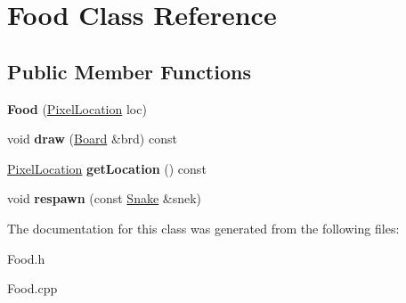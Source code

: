 \hypertarget{class_food}{}\section{Food Class Reference}
\label{class_food}
\subsection*{Public Member Functions}
\begin{DoxyCompactItemize}
\item 
\mbox{\label{class_food_abf88eb6961b943a2d481c08eca91cc2d}} 
{\bfseries Food} (\hyperlink{class_pixel_location}{Pixel\+Location} loc)
\item 
\mbox{\label{class_food_a2757ddcb688ca74d3e2e79d645e0ed0e}} 
void {\bfseries draw} (\hyperlink{class_board}{Board} \&brd) const
\item 
\mbox{\label{class_food_a7c3ffe081ee2b479696c0c89ed95455c}} 
\hyperlink{class_pixel_location}{Pixel\+Location} {\bfseries get\+Location} () const
\item 
\mbox{\label{class_food_afcd8485cf59e61adcc28cfc237bf3001}} 
void {\bfseries respawn} (const \hyperlink{class_snake}{Snake} \&snek)
\end{DoxyCompactItemize}


The documentation for this class was generated from the following files\+:\begin{DoxyCompactItemize}
\item 
Food.\+h\item 
Food.\+cpp\end{DoxyCompactItemize}
